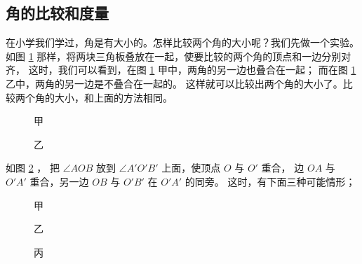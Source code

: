 \subsection{角的比较和度量}\label{subsec:czjh1-1-6}

在小学我们学过，角是有大小的。怎样比较两个角的大小呢？我们先做一个实验。
如图 \ref{fig:czjh1-1-26} 那样，将两块三角板叠放在一起，使要比较的两个角的顶点和一边分别对齐，
这时，我们可以看到，在图 \ref{fig:czjh1-1-26} 甲中，两角的另一边也叠合在一起；
而在图 \ref{fig:czjh1-1-26} 乙中，两角的另一边是不叠合在一起的。
这样就可以比较出两个角的大小了。比较两个角的大小，和上面的方法相同。

\begin{figure}[htbp]
    \centering
    \begin{minipage}[b]{7cm}
        \centering
        
        \caption*{甲}
    \end{minipage}
    \qquad
    \begin{minipage}[b]{7cm}
        \centering
        
        \caption*{乙}
    \end{minipage}
    \caption{}\label{fig:czjh1-1-26}
\end{figure}

如图 \ref{fig:czjh1-1-27} ， 把  $\angle AOB$ 放到 $\angle A'O'B'$ 上面，使顶点 $O$ 与 $O'$ 重合，
边 $OA$ 与 $O'A'$ 重合，另一边 $OB$ 与 $O'B'$ 在 $O'A'$ 的同旁。
这时，有下面三种可能情形；

{
    \def\baseabc{
        \tkzDefPoint(0,0){O}
        \tkzDefPoint(0:2){A}
        \tkzDefPoint(40:2){B}
        \tkzDrawSegments(O,A  O,B)
        \tkzLabelPoints[below](O, A)
        \tkzLabelPoints[right](B)
    }

    \def\comparedabc{
        \tkzDefPoint(0,0){O}
        \tkzDefPoint(0:2){A}
        \tkzDefPoint(40:2){B}
        \tkzDrawSegments(O,A  O,B)
        \tkzLabelPoint[below](O){$(O)$}
        \tkzLabelPoint[below](A){$(A)$}

        \tkzLabelPoint[above](O){$O'$}
        \tkzLabelPoint[above](A){$A'$}
    }
\begin{figure}[htbp]
    \centering
    \begin{minipage}[b]{4cm}
        \centering
        
        \caption*{甲}
    \end{minipage}
    \qquad
    \begin{minipage}[b]{4cm}
        \centering
        
        \caption*{乙}
    \end{minipage}
    \begin{minipage}[b]{4cm}
        \centering
        
        \caption*{丙}
    \end{minipage}
    \caption{}\label{fig:czjh1-1-27}
\end{figure}
}

